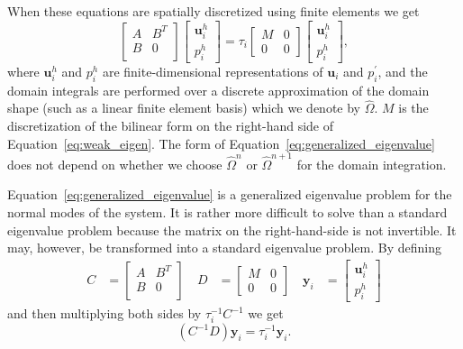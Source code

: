 \documentclass[preprint,12pt,authoryear]{elsarticle}
\begin{document}
When these equations are spatially discretized using finite elements \citep[see, e.g.][]{kronbichler2012high} we get
\begin{equation}
\begin{bmatrix}
A & B^T \\
B & 0 \\
\end{bmatrix}
\begin{bmatrix}
\mathbf{u}^h_i \\
p^h_i
\end{bmatrix}
=
\tau_i
\begin{bmatrix}
M & 0 \\
0 & 0
\end{bmatrix}
\begin{bmatrix}
\mathbf{u}^h_i \\
p^h_i
\end{bmatrix},
\label{eq:generalized_eigenvalue}
\end{equation}
where $\mathbf{u}^h_i$ and $p^h_i$ are finite-dimensional representations of $\mathbf{u}_i$ and $p^\prime_i$,
and the domain integrals are performed over a discrete approximation of the domain shape
(such as a linear finite element basis) which we denote by $\hat{\Omega}$.
$M$ is the discretization of the bilinear form on the right-hand side of Equation~\eqref{eq:weak_eigen}.
The form of Equation~\eqref{eq:generalized_eigenvalue} does not depend on whether we choose $\hat{\Omega}^n$ or $\hat{\Omega}^{n+1}$
for the domain integration.

Equation~\eqref{eq:generalized_eigenvalue} is a generalized eigenvalue problem for the normal modes of the system.
It is rather more difficult to solve than a standard eigenvalue problem because the matrix on the right-hand-side 
is not invertible. It may, however, be transformed into a standard eigenvalue problem.
By defining
\begin{equation}
\begin{aligned}
C &= 
\begin{bmatrix}
A & B^T \\
B & 0 \\
\end{bmatrix} \quad
D &= 
\begin{bmatrix}
M & 0 \\
0 & 0
\end{bmatrix} \quad
\mathbf{y}_i &= 
\begin{bmatrix}
\mathbf{u}^h_i \\
p^h_i
\end{bmatrix} 
\end{aligned}
\label{eq:eigen_substitution}
\end{equation}
and then multiplying both sides by $\tau_i^{-1}C^{-1}$ we get
\begin{equation}
(C^{-1}D)\mathbf{y}_i = \tau_i^{-1} \mathbf{y}_i.
\label{eq:standard_eigenvalue}
\end{equation}
\end{document}
